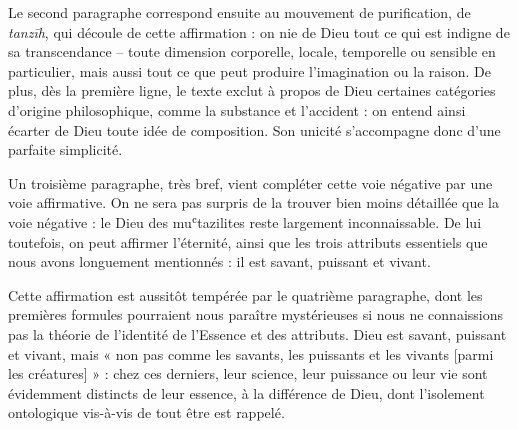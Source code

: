  

 

Le second paragraphe correspond ensuite au mouvement de purification, de
\emph{tanzīh}, qui découle de cette affirmation : on nie de Dieu tout ce
qui est indigne de sa transcendance -- toute dimension corporelle, locale, temporelle ou sensible en
particulier, mais aussi tout ce que peut produire l'imagination ou la
raison. De plus, dès la première ligne, le texte exclut à propos de Dieu
certaines catégories d'origine philosophique, comme la substance et
l'accident : on entend ainsi écarter de Dieu toute idée de composition.
Son unicité s'accompagne donc d'une parfaite simplicité.

Un troisième paragraphe, très bref, vient compléter cette voie négative
par une voie affirmative. On ne sera pas surpris de la trouver bien
moins détaillée que la voie négative : le Dieu des muʿtazilites reste
largement inconnaissable. De lui toutefois, on peut affirmer l'éternité,
ainsi que les trois attributs essentiels que nous avons longuement
mentionnés : il est savant, puissant et vivant.

Cette affirmation est aussitôt tempérée par le quatrième paragraphe,
dont les premières formules pourraient nous paraître mystérieuses si
nous ne connaissions pas la théorie de l'identité de l'Essence et des
attributs. Dieu est savant, puissant et vivant, mais
« non pas comme les savants, les puissants et les vivants {[}parmi les
créatures{]} » : chez ces derniers, leur science, leur puissance ou leur
vie sont évidemment distincts de leur essence, à la différence de Dieu,
dont l'isolement ontologique vis-à-vis de tout être est rappelé.

